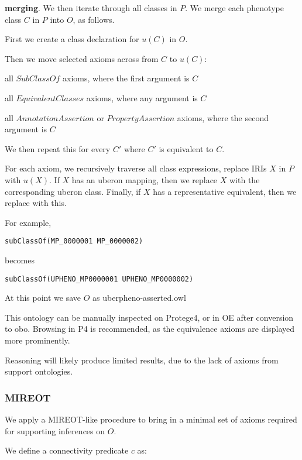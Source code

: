 \textbf{merging}. We then iterate through all classes in $P$. We
merge each phenotype class $C$ in $P$ into $O$, as follows.

First we create a class declaration for $u(C)$ in $O$.

Then we move selected axioms across from $C$ to $u(C)$:

\begin{description}
\item all $SubClassOf$ axioms, where the first argument is $C$
\item all $EquivalentClasses$ axioms, where any argument is $C$
\item all $AnnotationAssertion$ or $PropertyAssertion$ axioms, where the second argument is $C$
\end{description}

We then repeat this for every $C'$ where $C'$ is equivalent to $C$.

For each axiom, we recursively traverse all class expressions, replace
IRIs $X$ in $P$ with $u(X)$. If $X$ has an uberon mapping,
then we replace $X$ with the corresponding uberon class. Finally,
if $X$ has a representative equivalent, then we replace with this.

For example,

\begin{verbatim}
subClassOf(MP_0000001 MP_0000002)
\end{verbatim}

becomes

\begin{verbatim}
subClassOf(UPHENO_MP0000001 UPHENO_MP0000002)
\end{verbatim}

At this point we save $O$ as uberpheno-asserted.owl

This ontology can be manually inspected on Protege4, or in OE after
conversion to obo. Browsing in P4 is recommended, as the equivalence
axioms are displayed more prominently.

Reasoning will likely produce limited results, due to the lack of
axioms from support ontologies.

\subsubsection{MIREOT}

We apply a MIREOT-like procedure to bring in a minimal set of axioms
required for supporting inferences on $O$.

We define a connectivity predicate $c$ as:

